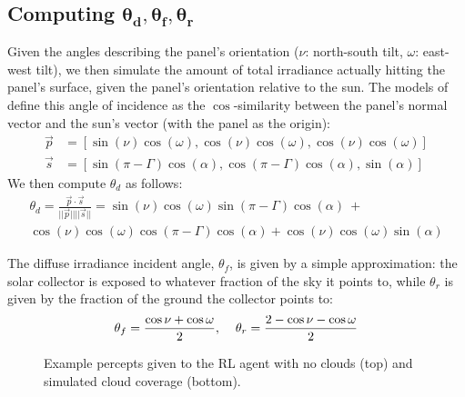 \documentclass{article}
\begin{document}
{%
\subsection{Computing $\pmb{\theta_d, \theta_f, \theta_r}$}
Given the angles describing the panel's orientation ($\nu$: north-south tilt, $\omega$: east-west tilt), we then simulate the amount of total irradiance actually hitting the panel's surface, given the panel's orientation relative to the sun. The models of~\citet{masters2013renewable} define this angle of incidence as the $\cos$-similarity between the panel's normal vector and the sun's vector (with the panel as the origin):
\begin{align*}
\vec{p} &= \left[ \sin(\nu)  \cos(\omega), \cos(\nu)  \cos(\omega), \cos(\nu) \cos(\omega) \right] \\
\vec{s} &= \left[ \sin(\pi - \Gamma)  \cos(\alpha), \cos(\pi - \Gamma)  \cos(\alpha), \sin(\alpha) \right]
\end{align*}
We then compute $\theta_d$ as follows:
\begin{multline}
\theta_d = \frac{\vec{p} \cdot \vec{s}}{||\vec{p}|| ||\vec{s} ||} = \sin(\nu)  \cos(\omega)  \sin(\pi - \Gamma)  \cos(\alpha)\ + \\
\cos(\nu)  \cos(\omega)  \cos(\pi - \Gamma)  \cos(\alpha) +  \cos(\nu) \cos(\omega)  \sin(\alpha) 
\end{multline}

The diffuse irradiance incident angle, $\theta_f$, is given by a simple approximation: the solar collector is exposed to whatever fraction of the sky it points to, while $\theta_r$ is given by the fraction of the ground the collector points to:
\begin{equation}
\theta_f = \frac{\cos \nu + \cos \omega}{2}, \hspace{4mm} \theta_r = \frac{2 - \cos\nu - \cos \omega}{2}
\end{equation}

\begin{figure}[t]
\begin{center}
 \hspace{16mm} %
\caption{Example percepts given to the RL agent with no clouds (top) and simulated cloud coverage (bottom).}
\end{center}
\end{figure}

}
\end{document}

